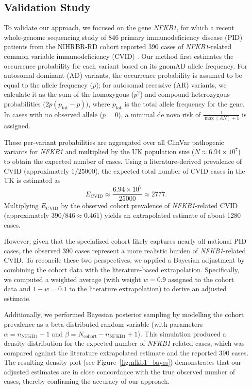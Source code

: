 \subsection{Validation Study}
To validate our approach, we focused on the gene \textit{NFKB1}, for which a recent whole‐genome sequencing study of 846 primary immunodeficiency disease (PID) patients from the NIHRBR-RD cohort reported 390 cases of \textit{NFKB1}-related common variable immunodeficiency (CVID) \citep{tuijnenburgNFKB12018}. Our method first estimates the occurrence probability for each variant based on its gnomAD allele frequency. For autosomal dominant (AD) variants, the occurrence probability is assumed to be equal to the allele frequency (\(p\)); for autosomal recessive (AR) variants, we calculate it as the sum of the homozygous (\(p^2\)) and compound heterozygous probabilities \(\bigl(2p(p_{\text{tot}}-p)\bigr)\), where \(p_{\text{tot}}\) is the total allele frequency for the gene. In cases with no observed allele (\(p=0\)), a minimal de novo risk of \(\frac{1}{\max(AN)+1}\) is assigned.

These per-variant probabilities are aggregated over all ClinVar pathogenic variants for \textit{NFKB1} and multiplied by the UK population size (\(N \approx 6.94 \times 10^7\)) to obtain the expected number of cases. Using a literature-derived prevalence of CVID (approximately \(1/25000\)), the expected total number of CVID cases in the UK is estimated as
\[
E_{\text{CVID}} \approx \frac{6.94 \times 10^7}{25000} \approx 2777.
\]
Multiplying \(E_{\text{CVID}}\) by the observed cohort prevalence of \textit{NFKB1}-related CVID (approximately \(390/846 \approx 0.461\)) yields an extrapolated estimate of about 1280 cases. 

However, given that the specialized cohort likely captures nearly all national PID cases, the observed 390 cases represent a more realistic burden of \textit{NFKB1}-related CVID. To reconcile these two perspectives, we applied a Bayesian adjustment by combining the cohort data with the literature-based extrapolation. Specifically, we computed a weighted average (with weight \(w = 0.9\) assigned to the cohort data and \(1-w = 0.1\) to the literature extrapolation) to derive an adjusted estimate. 

Additionally, we performed Bayesian posterior sampling by modelling the cohort prevalence as a beta-distributed random variable (with parameters \(\alpha = n_{\text{NFKB1}}+1\) and \(\beta = N_{\text{cohort}} - n_{\text{NFKB1}}+1\)). This simulation produced a density distribution for the expected number of \textit{NFKB1}-related cases, which was compared against the literature extrapolated estimate and the reported 390 cases. The resulting density plot (see Figure~\ref{fig:nfkb1_bayes}) demonstrates that our adjusted estimates are in close concordance with the true observed number of cases, thereby confirming the accuracy of our approach.



